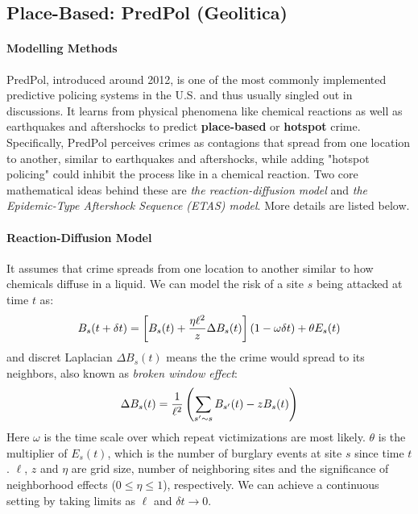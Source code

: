 \documentclass[11pt]{article}
\begin{document}
\subsection{Place-Based: PredPol (Geolitica)}
\paragraph{Modelling Methods} PredPol\cite{ferguson2017rise,ensign2017runaway}, introduced around 2012, is one of the most commonly implemented predictive policing systems in the U.S.\cite{pechini1967washington} and thus usually singled out in discussions. It learns from physical phenomena like chemical reactions as well as earthquakes and aftershocks to predict \textbf{place-based} or \textbf{hotspot} crime. Specifically, PredPol perceives crimes as contagions that spread from one location to another, similar to earthquakes and aftershocks, while adding "hotspot policing" could inhibit the process like in a chemical reaction. 
Two core mathematical ideas behind these are \textit{the reaction-diffusion model}\cite{react-diff-short2008statistical,react-diff-short2010nonlinear} and \textit{the Epidemic-Type Aftershock Sequence (ETAS) model}\cite{ETAS_ogata1988statistical}. More details are listed below.

\paragraph{Reaction-Diffusion Model\cite{react-diff-short2008statistical,react-diff-short2010nonlinear}} 
It assumes that crime spreads from one location to another similar to how chemicals diffuse in a liquid. We can model the risk of a site $s$ being attacked at time $t$ as:
\vspace*{-1em}
\begin{equation}
    B_s(t + \delta t) = \left[ B_s(t) + \frac{\eta \ell^2}{z} \Delta B_s(t) \right] (1 - \omega \delta t) + \theta E_s(t)
    \vspace*{-0.3em}
\end{equation}
and discret Laplacian $\Delta B_s(t)$ means the the crime would spread to its neighbors, also known as \textit{broken window effect}:
\vspace*{-1em}
\begin{equation}
    \Delta B_s(t) = \frac{1}{\ell^2} \left( \sum_{s' \sim s} B_{s'}(t) - z B_s(t) \right)
    \vspace*{-0.3em}
\end{equation}
Here $\omega$ is the time scale over which repeat victimizations are most likely. $\theta$ is the multiplier of $E_s(t)$, which is the number of burglary events at site $s$ since time $t$. $\ell$, $z$ and $\eta$ are grid size, number of neighboring sites and the significance of neighborhood effects ($0 \leq \eta \leq 1$), respectively. We can achieve a continuous setting by taking limits as $\ell$ and $\delta t \to 0$.
\end{document}

